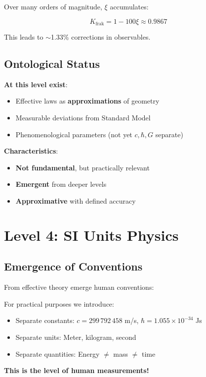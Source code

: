 	Over many orders of magnitude, $\xi$ accumulates:
	
	\begin{equation}
		K_{\text{frak}} = 1 - 100\xi \approx 0.9867
	\end{equation}
	
	This leads to $\sim$1.33\% corrections in observables.
	
	\subsection{Ontological Status}
	
	\textbf{At this level exist}:
	\begin{itemize}
		\item Effective laws as \textbf{approximations} of geometry
		\item Measurable deviations from Standard Model
		\item Phenomenological parameters (not yet $c, \hbar, G$ separate)
	\end{itemize}
	
	\textbf{Characteristics}:
	\begin{itemize}
		\item \textbf{Not fundamental}, but practically relevant
		\item \textbf{Emergent} from deeper levels
		\item \textbf{Approximative} with defined accuracy
	\end{itemize}
	
	\section{Level 4: SI Units Physics}
	
	\subsection{Emergence of Conventions}
	
	From effective theory emerge human conventions:
	
	\begin{keyresult}
		For practical purposes we introduce:
		
		\begin{itemize}
			\item Separate constants: $c = 299\,792\,458$ m/s, $\hbar = 1.055 \times 10^{-34}$ Js
			\item Separate units: Meter, kilogram, second
			\item Separate quantities: Energy $\neq$ mass $\neq$ time
		\end{itemize}
		
		\textbf{This is the level of human measurements!}
	\end{keyresult}
	
